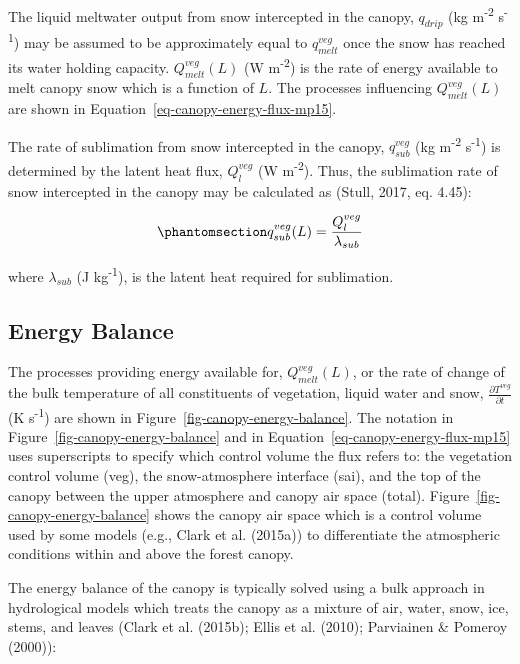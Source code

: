\documentclass[
  letterpaper,
]{tex/uofsthesis-cs}
\begin{document}
The liquid meltwater output from snow intercepted in the canopy,
\(q_{drip}\) (kg m\textsuperscript{-2} s\textsuperscript{-1}) may be
assumed to be approximately equal to \(q_{melt}^{veg}\) once the snow
has reached its water holding capacity. \(Q_{melt}^{veg}(L)\) (W
m\textsuperscript{-2}) is the rate of energy available to melt canopy
snow which is a function of \(L\). The processes influencing
\(Q_{melt}^{veg}(L)\) are shown in
Equation~\ref{eq-canopy-energy-flux-mp15}.

The rate of sublimation from snow intercepted in the canopy,
\(q_{sub}^{veg}\) (kg m\textsuperscript{-2} s\textsuperscript{-1}) is
determined by the latent heat flux, \(Q_{l}^{veg}\) (W
m\textsuperscript{-2}). Thus, the sublimation rate of snow intercepted
in the canopy may be calculated as (Stull, 2017, eq. 4.45):

\begin{equation}\phantomsection\label{eq-lsub}{
q_{sub}^{veg}(L) = \frac{Q_{l}^{veg}}{\lambda_{sub}}
}\end{equation}

where \(\lambda_{sub}\) (J kg\textsuperscript{-1}), is the latent heat
required for sublimation.

\subsection{Energy Balance}\label{energy-balance}

The processes providing energy available for, \(Q_{melt}^{veg}(L)\), or
the rate of change of the bulk temperature of all constituents of
vegetation, liquid water and snow,
\(\frac{\partial T^{veg}}{\partial t}\) (K s\textsuperscript{-1}) are
shown in Figure~\ref{fig-canopy-energy-balance}. The notation in
Figure~\ref{fig-canopy-energy-balance} and in
Equation~\ref{eq-canopy-energy-flux-mp15} uses superscripts to specify
which control volume the flux refers to: the vegetation control volume
(veg), the snow-atmosphere interface (sai), and the top of the canopy
between the upper atmosphere and canopy air space (total).
Figure~\ref{fig-canopy-energy-balance} shows the canopy air space which
is a control volume used by some models (e.g., Clark et al. (2015a)) to
differentiate the atmospheric conditions within and above the forest
canopy.

The energy balance of the canopy is typically solved using a bulk
approach in hydrological models which treats the canopy as a mixture of
air, water, snow, ice, stems, and leaves (Clark et al. (2015b); Ellis et
al. (2010); Parviainen \& Pomeroy (2000)):
\end{document}
